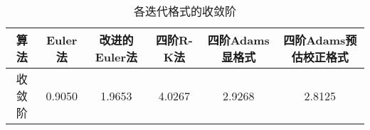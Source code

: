 \documentclass[12pt, a4paper, oneside]{ctexart}
\begin{document}
\begin{table}[h] %
    \centering
    \begin{tabular}{@{}cccccc@{}}
        \toprule
        算法 & Euler法 & 改进的Euler法 & 四阶R-K法 & 四阶Adams显格式 & 四阶Adams预估校正格式 \\ \midrule 
        收敛阶 & 0.9050 & 1.9653 & 4.0267 & 2.9268 & 2.8125 \\ \bottomrule
        \end{tabular}
	\caption{各迭代格式的收敛阶}
\end{table}
\end{document}
